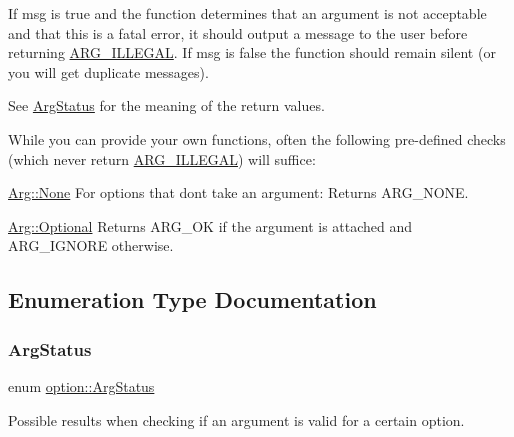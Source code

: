 If {\ttfamily msg} is {\ttfamily true} and the function determines that an argument is not acceptable and that this is a fatal error, it should output a message to the user before returning \hyperlink{namespaceoption_aee8c76a07877335762631491e7a5a1a9a9528e32563b795bd2930b12d0a5e382d}{A\+R\+G\+\_\+\+I\+L\+L\+E\+G\+AL}. If {\ttfamily msg} is {\ttfamily false} the function should remain silent (or you will get duplicate messages).

See \hyperlink{namespaceoption_aee8c76a07877335762631491e7a5a1a9}{Arg\+Status} for the meaning of the return values.

While you can provide your own functions, often the following pre-\/defined checks (which never return \hyperlink{namespaceoption_aee8c76a07877335762631491e7a5a1a9a9528e32563b795bd2930b12d0a5e382d}{A\+R\+G\+\_\+\+I\+L\+L\+E\+G\+AL}) will suffice\+:

\begin{DoxyItemize}
\item {\ttfamily \hyperlink{structoption_1_1_arg_a7fc01987899c91c6b6a1be5711a46e22}{Arg\+::\+None}} For options that don\textquotesingle{}t take an argument\+: Returns A\+R\+G\+\_\+\+N\+O\+NE. \item {\ttfamily \hyperlink{structoption_1_1_arg_aadb5316ecbc9eb0a7f0019d14bf35ad0}{Arg\+::\+Optional}} Returns A\+R\+G\+\_\+\+OK if the argument is attached and A\+R\+G\+\_\+\+I\+G\+N\+O\+RE otherwise. \end{DoxyItemize}


\subsection{Enumeration Type Documentation}
\mbox{\label{namespaceoption_aee8c76a07877335762631491e7a5a1a9}} 
\subsubsection{\texorpdfstring{Arg\+Status}{ArgStatus}}
{\footnotesize\ttfamily enum \hyperlink{namespaceoption_aee8c76a07877335762631491e7a5a1a9}{option\+::\+Arg\+Status}}



Possible results when checking if an argument is valid for a certain option. 

